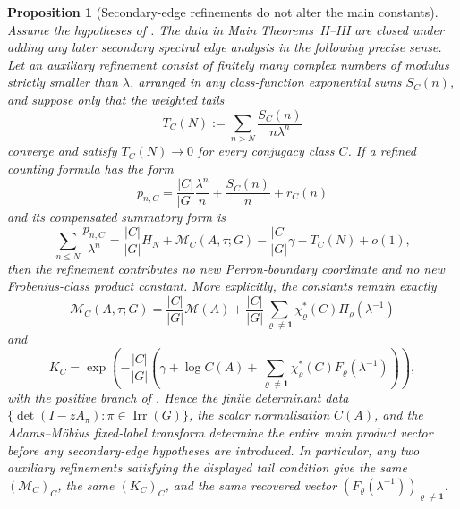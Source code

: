 \documentclass[11pt,a4paper]{amsart}
\theoremstyle{plain}
\newtheorem{proposition}[theorem]{Proposition}
\theoremstyle{definition}
\theoremstyle{remark}
\DeclareMathOperator{\Irr}{Irr}
\begin{document}
\begin{proposition}[Secondary-edge refinements do not alter the main constants]
  \label{prop:main-chain-secondary-noninterference}
  Assume the hypotheses of .  The data in
  Main Theorems~II--III are closed under adding any later secondary spectral
  edge analysis in the following precise sense.
  Let an auxiliary refinement consist of finitely many complex numbers of modulus
  strictly smaller than \(\lambda\), arranged in any class-function
  exponential sums \(S_C(n)\), and suppose only that the weighted tails
  \[
    T_C(N):=\sum_{n>N}\frac{S_C(n)}{n\lambda^n}
  \]
  converge and satisfy \(T_C(N)\to0\) for every conjugacy class \(C\).  If a
  refined counting formula has the form
  \begin{equation}\label{eq:secondary-noninterference-refined-count}
    p_{n,C}
    =
    \frac{|C|}{|G|}\frac{\lambda^n}{n}
    +\frac{S_C(n)}{n}+r_C(n)
  \end{equation}
  and its compensated summatory form is
  \begin{equation}\label{eq:secondary-noninterference-refined-sum}
    \sum_{n\le N}\frac{p_{n,C}}{\lambda^n}
    =
    \frac{|C|}{|G|}H_N
    +\mathcal M_C(A,\tau;G)-\frac{|C|}{|G|}\gamma
    -T_C(N)+o(1),
  \end{equation}
  then the refinement contributes no new Perron-boundary coordinate and
  no new Frobenius-class product constant.  More explicitly, the constants
  remain exactly
  \begin{equation}\label{eq:secondary-noninterference-mc}
    \mathcal M_C(A,\tau;G)
    =
    \frac{|C|}{|G|}\mathcal M(A)
    +\frac{|C|}{|G|}
      \sum_{\varrho\neq\mathbf1}
        \chi_\varrho^\ast(C)\Pi_\varrho(\lambda^{-1})
  \end{equation}
  and
  \begin{equation}\label{eq:secondary-noninterference-k}
    K_C=
    \exp\!\left(
      -\frac{|C|}{|G|}
      \left(
        \gamma+\log C(A)
        +\sum_{\varrho\neq\mathbf1}
          \chi_\varrho^\ast(C)F_\varrho(\lambda^{-1})
      \right)
    \right),
  \end{equation}
  with the positive branch of .  Hence
  the finite determinant data
  \(\{\det(I-zA_\pi):\pi\in\Irr(G)\}\), the scalar normalisation \(C(A)\),
  and the Adams--M\"obius fixed-label transform determine the entire main
  product vector before any secondary-edge hypotheses are introduced.  In
  particular, any two auxiliary refinements satisfying the displayed tail
  condition give the same \((\mathcal M_C)_C\), the same \((K_C)_C\), and the
  same recovered vector \((F_\varrho(\lambda^{-1}))_{\varrho\neq\mathbf1}\).
\end{proposition}
\end{document}
